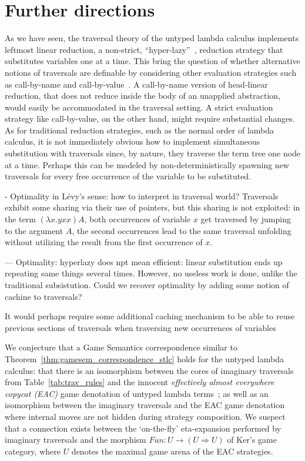 \documentclass{elsarticle}
\theoremstyle{plain}
\theoremstyle{definition}
\begin{document}
\section{Further directions}

As we have seen, the traversal theory of the untyped lambda calculus implements leftmost linear reduction, a non-strict, ``hyper-lazy''~\cite{danosherbelinregnier1996}, reduction strategy that substitutes variables one at a time. This bring the question of whether alternative notions of traversals are definable by considering other evaluation strategies such as call-by-name and call-by-value~\cite{plotkin-75}. A call-by-name version of head-linear reduction, that does not reduce inside the body of an unapplied abstraction, would easily be accommodated in the traversal setting. A strict evaluation strategy like call-by-value, on the other hand, might require substantial changes. As for traditional reduction strategies, such as the normal order of lambda calculus, it is not immediately obvious how to implement simultaneous substitution with traversals since, by nature, they traverse the term tree one node at a time. Perhaps this can be modeled by non-deterministically spawning new traversals for every free occurrence of the variable to be substituted.


\begin{todobox}
- Optimality in L\'evy's sense: how to interpret in traversal world?
Traversals exhibit some sharing via their use of pointers, but this sharing is not exploited: in the term $(\lambda x. y x x) A$, both occurrences of variable $x$ get traversed by jumping to the argument $A$, the second occurrences lead to the same traversal unfolding without utilizing the result from the first occurrence of $x$.

--- Optimality: hyperlazy does npt mean efficient: linear substitution ends up repeating same things several times. However, no useless work is done, unlike the traditional subsistution. Could we recover optimality by adding some notion of cachine to traversals?

It would perhaps require some additional caching mechanism to be able to reuse previous sections of traversals when traversing new occurrences of variables

\end{todobox}


We conjecture that a Game Semantics correspondence similar
to Theorem~\ref{thm:gamesem_correspondence_stlc} holds for
the untyped lambda calculus: that there is an isomorphism between the cores of imaginary traversals from Table~\ref{tab:trav_rules} and the innocent \emph{effectively almost everywhere copycat (EAC)} game denotation of untyped lambda terms~\cite{KerThesis}; as well as an isomorphism between the imaginary traversals and the EAC game denotation where internal moves are not hidden during strategy composition. We suspect that a connection exists between the `on-the-fly' eta-expansion performed by imaginary traversals and the morphism $Fun : U \rightarrow (U \Rightarrow U)$ of Ker's game category, where $U$ denotes the maximal game arena of the EAC strategies.
\end{document}
